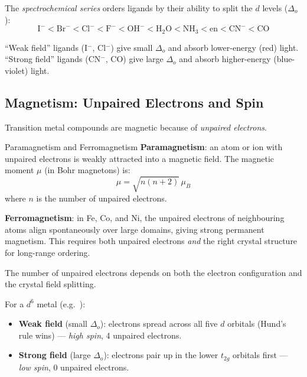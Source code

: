 \documentclass[12pt, a4paper]{book}
\newcommand{\newterm}[1]{\textit{\textcolor{DiscoveryColor}{#1}}}
\begin{document}
\begin{center}
\begin{tikzpicture}[every node/.style={font=\sffamily\small}, scale=0.95]
\end{tikzpicture}
\end{center}

The \newterm{spectrochemical series} orders ligands by their
ability to split the $d$ levels ($\Delta_o$):
\[
  \text{I}^- < \text{Br}^- < \text{Cl}^- < \text{F}^- <
  \text{OH}^- < \text{H}_2\text{O} < \text{NH}_3 <
  \text{en} < \text{CN}^- < \text{CO}
\]

``Weak field'' ligands (I$^-$, Cl$^-$) give small $\Delta_o$
and absorb lower-energy (red) light.
``Strong field'' ligands (CN$^-$, CO) give large $\Delta_o$
and absorb higher-energy (blue-violet) light.

\subsection{Magnetism: Unpaired Electrons and Spin}

Transition metal compounds are magnetic because of
\emph{unpaired electrons}.

\begin{namedconcept}{Paramagnetism and Ferromagnetism}
\textbf{Paramagnetism}: an atom or ion with unpaired
electrons is weakly attracted into a magnetic field.
The magnetic moment $\mu$ (in Bohr magnetons) is:
\[
  \mu = \sqrt{n(n+2)}\,\mu_B
\]
where $n$ is the number of unpaired electrons.

\textbf{Ferromagnetism}: in Fe, Co, and Ni, the unpaired
electrons of neighbouring atoms align spontaneously
over large domains, giving strong permanent magnetism.
This requires both unpaired electrons \emph{and}
the right crystal structure for long-range ordering.
\end{namedconcept}

\vspace{0.5em}

The number of unpaired electrons depends on both the
electron configuration and the crystal field splitting.

For a $d^6$ metal (e.g.\ ):
\begin{itemize}[nosep, leftmargin=2em]
  \item \textbf{Weak field} (small $\Delta_o$): electrons
        spread across all five $d$ orbitals (Hund's rule wins)
        --- \newterm{high spin}, 4 unpaired electrons.
  \item \textbf{Strong field} (large $\Delta_o$): electrons
        pair up in the lower $t_{2g}$ orbitals first
        --- \newterm{low spin}, 0 unpaired electrons.
\end{itemize}
\end{document}
